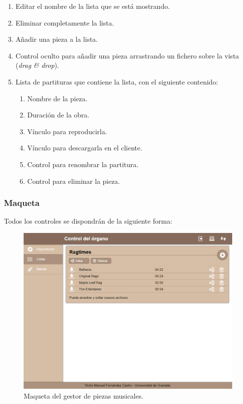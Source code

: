 \begin{enumerate}
	\item Editar el nombre de la lista que se está mostrando.
	\item Eliminar completamente la lista.
	\item Añadir una pieza a la lista.
	\item Control oculto para añadir una pieza arrastrando un fichero sobre la vista (\textit{drag \& drop}).
	\item Lista de partituras que contiene la lista, con el siguiente contenido:
	
	\begin{enumerate}
		\item Nombre de la pieza.
		\item Duración de la obra.
		\item Vínculo para reproducirla.
		\item Vínculo para descargarla en el cliente.
		\item Control para renombrar la partitura.
		\item Control para eliminar la pieza.
	\end{enumerate}
\end{enumerate}

\subsubsection{Maqueta}

Todos los controles se dispondrán de la siguiente forma:

\smallskip

\begin{figure}[H]
	\noindent \begin{centering}
		\includegraphics[width=\linewidth*3/4]{capitulo4/cap_piezas}
		\par\end{centering}
	\smallskip
	\caption{\label{fig:cap_piezas} Maqueta del gestor de piezas musicales.}
\end{figure} 

